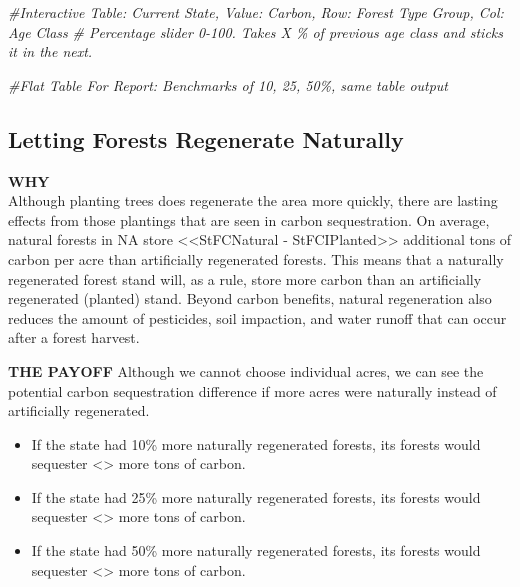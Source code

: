 \documentclass[
]{article}
\newenvironment{Shaded}{\begin{snugshade}}{\end{snugshade}}
\newcommand{\CommentTok}[1]{\textcolor[rgb]{0.56,0.35,0.01}{\textit{#1}}}
\begin{document}
\begin{Shaded}
\begin{Highlighting}[]
\CommentTok{\#Interactive Table: Current State, Value: Carbon, Row: Forest Type Group, Col: Age Class}
\CommentTok{\#   Percentage slider 0{-}100. Takes X \% of previous age class and sticks it in the next.}

\CommentTok{\#Flat Table For Report: Benchmarks of 10, 25, 50\%, same table output}
\end{Highlighting}
\end{Shaded}

\hypertarget{letting-forests-regenerate-naturally}{%
\subsection{Letting Forests Regenerate
Naturally}\label{letting-forests-regenerate-naturally}}

\textbf{WHY}\\
Although planting trees does regenerate the area more quickly, there are
lasting effects from those plantings that are seen in carbon
sequestration. On average, natural forests in NA store
\textless\textless StFCNatural - StFCIPlanted\textgreater\textgreater{}
additional tons of carbon per acre than artificially regenerated
forests. This means that a naturally regenerated forest stand will, as a
rule, store more carbon than an artificially regenerated (planted)
stand. Beyond carbon benefits, natural regeneration also reduces the
amount of pesticides, soil impaction, and water runoff that can occur
after a forest harvest.

\textbf{THE PAYOFF} Although we cannot choose individual acres, we can
see the potential carbon sequestration difference if more acres were
naturally instead of artificially regenerated.

\begin{itemize}
\item
  If the state had 10\% more naturally regenerated forests, its forests
  would sequester \textless{}\textgreater{} more tons of carbon.
\item
  If the state had 25\% more naturally regenerated forests, its forests
  would sequester \textless{}\textgreater{} more tons of carbon.
\item
  If the state had 50\% more naturally regenerated forests, its forests
  would sequester \textless{}\textgreater{} more tons of carbon.
\end{itemize}
\end{document}
